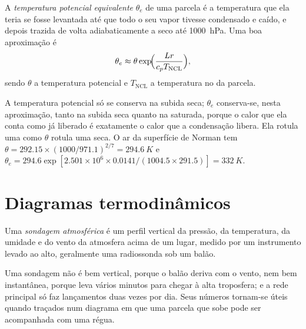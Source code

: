 \begin{definition}\label{def:b2:atmospheric-thermodynamics:theta-e}
A \emph{temperatura potencial equivalente} $\theta_e$ de
uma parcela é a temperatura que ela teria se fosse levantada até que todo o seu vapor tivesse condensado
e caído, e depois trazida de volta adiabaticamente a seco até \qty{1000}{hPa}. Uma boa aproximação é
\[
  \theta_e \approx \theta \exp\!\Bigl(\frac{L r}{c_p T_{\text{NCL}}}\Bigr),
\]
sendo $\theta$ a temperatura potencial e $T_{\text{NCL}}$ a temperatura no  da parcela.
\end{definition}

A temperatura potencial só se conserva na subida seca; $\theta_e$ conserva-se, nesta
aproximação, tanto na subida seca quanto na saturada, porque o calor que ela conta como já liberado
é exatamente o calor que a condensação libera. Ela rotula uma  como $\theta$ rotula uma seca.
O ar da superfície de Norman tem $\theta = 292.15 \times (1000/971.1)^{2/7} = \qty{294.6}{K}$ e
$\theta_e = 294.6 \exp[2.501 \times 10^6 \times 0.0141/(1004.5 \times 291.5)] = \qty{332}{K}$.

\section{Diagramas termodinâmicos}\label{sec:b2:atmospheric-thermodynamics:diagrams}

\begin{definition}\label{def:b2:atmospheric-thermodynamics:sounding}
Uma \emph{sondagem atmosférica} é um perfil vertical da
pressão, da temperatura, da umidade e do vento da atmosfera acima de um lugar, medido por um
instrumento levado ao alto, geralmente uma radiossonda sob um balão.
\end{definition}

Uma sondagem não é bem vertical, porque o balão deriva com o vento, nem bem
instantânea, porque leva vários minutos para chegar à alta troposfera; e a rede principal
só faz lançamentos duas vezes por dia. Seus números tornam-se úteis quando traçados num diagrama
em que uma parcela que sobe pode ser acompanhada com uma régua.

